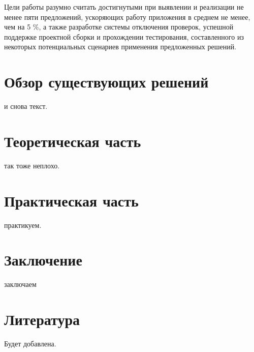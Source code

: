 \documentclass{mipt-thesis-bs}
\begin{document}
Цели работы разумно считать достигнутыми при выявлении и реализации не менее пяти предложений, ускоряющих работу приложения в среднем не менее, чем на 5 \%, 
а также разработке системы отключения проверок, успешной поддержке проектной сборки и прохождении тестирования, составленного из некоторых 
потенциальных сценариев применения предложенных решений.

\chapter{Обзор существующих решений}
и снова текст.


\chapter{Теоретическая часть}
так тоже неплохо.

\chapter{Практическая часть}
практикуем.

\chapter{Заключение}
заключаем

\backmatter


\chapter{Литература}

Будет добавлена.
\end{document}
